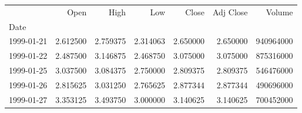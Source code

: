 \begin{tabular}{lrrrrrr}
\toprule
{} &      Open &      High &       Low &     Close &  Adj Close &     Volume \\
Date       &           &           &           &           &            &            \\
\midrule
1999-01-21 &  2.612500 &  2.759375 &  2.314063 &  2.650000 &   2.650000 &  940964000 \\
1999-01-22 &  2.487500 &  3.146875 &  2.468750 &  3.075000 &   3.075000 &  875316000 \\
1999-01-25 &  3.037500 &  3.084375 &  2.750000 &  2.809375 &   2.809375 &  546476000 \\
1999-01-26 &  2.815625 &  3.031250 &  2.765625 &  2.877344 &   2.877344 &  490696000 \\
1999-01-27 &  3.353125 &  3.493750 &  3.000000 &  3.140625 &   3.140625 &  700452000 \\
\bottomrule
\end{tabular}
